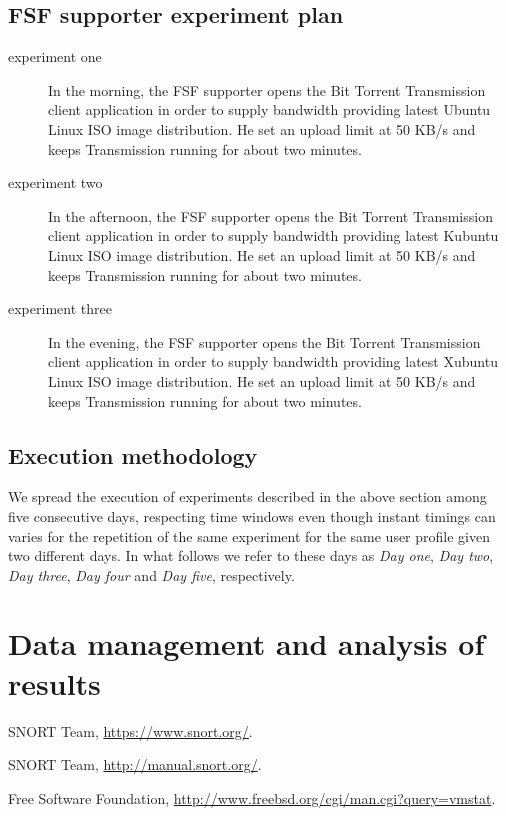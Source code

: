 \documentclass[10pt,a4paper]{article}
\begin{document}
    \subsection{FSF supporter experiment plan}
    \begin{description}
    \item[experiment one] In the morning, the FSF supporter opens
      the Bit Torrent Transmission client application in order to
      supply bandwidth providing latest Ubuntu Linux ISO image
      distribution. He set an upload limit at 50 KB/s and keeps
      Transmission running for about two minutes.
    \item[experiment two] In the afternoon, the FSF supporter opens
      the Bit Torrent Transmission client application in order to
      supply bandwidth providing latest Kubuntu Linux ISO image
      distribution. He set an upload limit at 50 KB/s and keeps
      Transmission running for about two minutes.
    \item[experiment three] In the evening, the FSF supporter opens
      the Bit Torrent Transmission client application in order to
      supply bandwidth providing latest Xubuntu Linux ISO image
      distribution. He set an upload limit at 50 KB/s and keeps
      Transmission running for about two minutes.
    \end{description}

    \subsection{Execution methodology}

    We spread the execution of experiments described in the above
    section among five consecutive days, respecting time windows even
    though instant timings can varies for the repetition of the same
    experiment for the same user profile given two different days. In
    what follows we refer to these days as \emph{Day one}, \emph{Day
      two}, \emph{Day three}, \emph{Day four} and \emph{Day five},
    respectively.

    \section{Data management and analysis of results}
    \label{sec:data-management-result-analysis}
    \lipsum[1]
    
    \begin{thebibliography}{9}

      SNORT Team,
      \url{https://www.snort.org/}.

      SNORT Team,
      \url{http://manual.snort.org/}.

      Free Software Foundation,
      \url{http://www.freebsd.org/cgi/man.cgi?query=vmstat}.
    \end{thebibliography}
\end{document}
